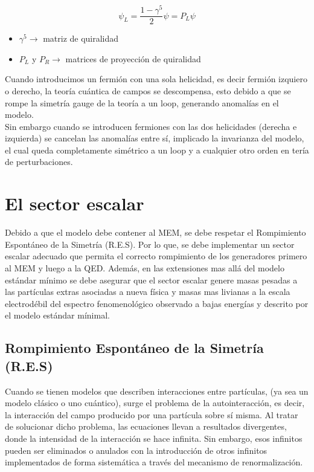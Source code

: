 \documentclass[12pt]{article}
\begin{document}
\begin{equation}
\psi_L= \frac{1-\gamma^{5}}{2}\psi= P_L\psi
\label{eq:2**}
\end{equation} 

\begin{itemize}
    \item \(\gamma^{5} \rightarrow \) matriz de quiralidad
    \item \(P_L \) y \(P_R \rightarrow \) matrices de proyección de quiralidad
\end{itemize}


Cuando introducimos un fermión con una sola helicidad, es decir fermión izquiero o derecho, la teoría cuántica de campos se descompensa, esto debido a que se rompe la simetría gauge de la teoría a un loop, generando anomalías en el modelo. \\

Sin embargo cuando se introducen fermiones con las dos helicidades (derecha e izquierda) se cancelan las anomalías entre sí, implicado la invarianza del modelo, el cual queda  completamente simétrico a un loop y a cualquier otro orden en tería de perturbaciones. 


\section{El sector escalar}

Debido a que el modelo debe contener al MEM, se debe respetar el Rompimiento Espontáneo de la Simetría (R.E.S). Por lo que, se debe implementar un sector escalar adecuado que permita el correcto rompimiento de los generadores primero al MEM y luego a la QED. Además, en las extensiones mas allá del modelo estándar mínimo se debe asegurar que el sector escalar genere masas pesadas a las partículas extras asociadas a nueva física y masas mas livianas a la escala electrodébil del espectro fenomenológico observado a bajas energías y descrito por el modelo estándar mínimal.  


\subsection{Rompimiento Espontáneo de la Simetría (R.E.S)}

Cuando se tienen modelos que describen interacciones entre partículas, (ya sea un modelo clásico o uno cuántico), surge el problema de la autointeracción, es decir, la interacción del campo producido por una partícula sobre sí misma. Al tratar de solucionar dicho problema, las ecuaciones llevan a resultados divergentes, donde la intensidad de la interacción se hace infinita. Sin embargo, esos infinitos pueden ser eliminados o anulados con la introducción de otros infinitos implementados de forma sistemática a través del mecanismo de renormalización. \\
\end{document}
